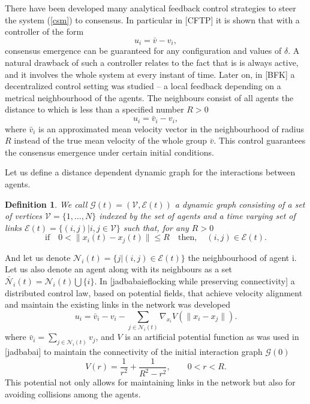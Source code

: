 \documentclass[a4paper,10pt, english]{article}
\newtheorem{dfn}{Definition}[section]
\begin{document}
There have been developed many analytical feedback control strategies  to steer the system (\ref{csm}) to consensus. In particular in [CFTP] it is shown that with a controller 
of the form
$$
u_i = \bar{v} - v_i,
$$
consensus emergence can be guaranteed for any configuration and values of $\delta$. A natural drawback of such a controller relates to the fact that is is always active, and it involves the whole system at every
instant of time. Later on,  in [BFK] a decentralized control setting  was studied \--- a local feedback depending on a metrical neighbourhood of the agents. The neighbours consist of all agents 
the distance to which is less than a specified number $R>0$
$$
u_i = \bar{v}_i - v_i,
$$
where $\bar{v}_i$ is an approximated mean velocity vector in the neighbourhood of radius $R$ instead of the true mean velocity of the whole group $\bar{v}$. This control guarantees the consensus emergence under certain initial conditions.




Let us define a distance dependent dynamic graph for the interactions between agents.
\begin{dfn}
We call $\mathcal{G}(t) =  (\mathcal{V}, \mathcal{E}(t) )$ a dynamic graph consisting of a set of vertices $\mathcal{V} = \{1, \dots,  N\}$ indexed by the set of agents and a time varying set of links 
$\mathcal{E}(t) = \{(i, j)|i, j \in \mathcal{V}\}$ such that, for any $R>0$
$$
\mbox{if}\quad 0<\|x_i(t) - x_j(t)\| \leq R \quad\mbox{then},\quad (i, j)\in \mathcal{E}(t).
$$
\end{dfn}
And let us denote $\mathcal{N}_i(t) = \{j|(i, j)\in\mathcal{E}(t)\}$ the neighbourhood of agent i.
Let us also denote an agent along with its neighbours as a set $\bar{\mathcal{N}}_i(t) = \mathcal{N}_i(t)\bigcup \{i\}$.
In [jadbabaieflocking while preserving connectivity] a distributed control law, based on potential fields, that achieve velocity alignment and maintain the existing links in the network was developed 
\begin{equation}
u_i = \bar{v}_i - v_i - \sum_{j \in \mathcal{N}_i(t)}\nabla_{x_i}V(\|x_i - x_j\|).
\label{controljad}
\end{equation}
where $\bar{v}_i = \sum_{j \in \mathcal{N}_i(t)} v_j$, and $V$ is an artificial potential function  as was used in [jadbabai] to maintain the connectivity of the initial interaction graph $\mathcal{G}(0)$ 
\begin{equation}
 V(r) = \frac{1}{r^2} + \frac{1}{R^2 - r^2}, \qquad 0 < r < R.
\label{potential}
\end{equation}
This potential not only allows for maintaining links in the network but also for avoiding collisions among the agents.
\end{document}
